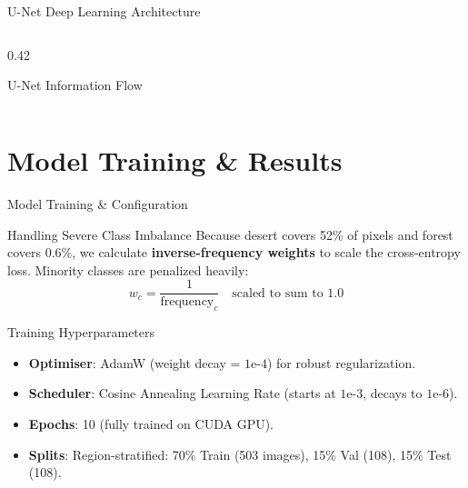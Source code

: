\documentclass[aspectratio=169]{beamer}
\begin{document}
\begin{frame}{U-Net Deep Learning Architecture}
\begin{columns}
\begin{column}{0.42\textwidth}
            \vskip0.1cm
            \footnotesize U-Net Information Flow
        \end{column}
    \end{columns}
\end{frame}

\section{Model Training \& Results}
\begin{frame}{Model Training \& Configuration}
    \begin{block}{Handling Severe Class Imbalance}
        Because desert covers 52\% of pixels and forest covers 0.6\%, we calculate \textbf{inverse-frequency weights} to scale the cross-entropy loss. Minority classes are penalized heavily:
        $$w_c = \frac{1}{\text{frequency}_c} \quad \text{scaled to sum to 1.0}$$
    \end{block}
    \begin{block}{Training Hyperparameters}
        \begin{itemize}
            \item \textbf{Optimiser}: AdamW (weight decay = $1\text{e-}4$) for robust regularization.
            \item \textbf{Scheduler}: Cosine Annealing Learning Rate (starts at $1\text{e-}3$, decays to $1\text{e-}6$).
            \item \textbf{Epochs}: 10 (fully trained on CUDA GPU).
            \item \textbf{Splits}: Region-stratified: 70\% Train (503 images), 15\% Val (108), 15\% Test (108).
        \end{itemize}
    \end{block}
\end{frame}
\end{document}
